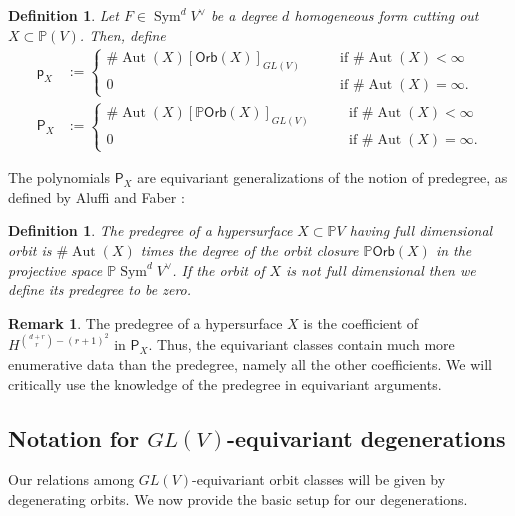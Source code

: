 \documentclass[12 pt, reqno]{amsart}
\newtheorem{defn}[thm]{Definition}
\theoremstyle{definition}
\newtheorem{rmk}[thm]{Remark}
\newcommand{\on}{\operatorname}
\newcommand{\mb}{\mathbb}
\renewcommand{\P}{\mb{P}}
\newcommand{\Orb}{\mathsf{Orb}}
\newcommand{\p}{\mathsf{p}}
\begin{document}
\begin{defn}
\label{orbitthomdef}
Let $F \in \on{Sym}^dV^{\vee}$ be a degree $d$ homogeneous form
cutting out $X \subset \mathbb{P}(V)$. Then, define
\begin{align*}
  \p_X&:= \begin{cases}
    \#\on{Aut}(X)[\Orb(X)]_{GL(V)} &\qquad\text{if $\#\on{Aut}(X)<\infty$}\\
    0 &\qquad\text{if $\#\on{Aut}(X)=\infty$}.
  \end{cases}\\
  \mathsf{P}_X&:= \begin{cases}
    \#\on{Aut}(X)[\mb{P}\Orb(X)]_{GL(V)} &\qquad\text{if $\#\on{Aut}(X)<\infty$}\\
    0 &\qquad\text{if $\#\on{Aut}(X)=\infty$}.
    \end{cases}   
\end{align*}
\end{defn}

The polynomials $\mathsf{P}_X$ are equivariant generalizations of the
notion of predegree, as defined by Aluffi and Faber
\cite[Definition]{AF93}:
\begin{defn}
\label{predegree}
The {\sl predegree} of a hypersurface $X \subset \P V$ having full
dimensional orbit is $\#\on{Aut}(X)$ times the degree of the orbit
closure $\P \Orb(X)$ in the projective space
$\mb{P} \on{Sym}^{d}V^{\vee}$.  If the orbit of $X$ is not full
dimensional then we define its predegree to be zero.
\end{defn}
\begin{rmk}
  The predegree of a hypersurface $X$ is the coefficient of
  $H^{{d+r \choose r}-(r+1)^2}$ in $\mathsf{P}_{X}$.  Thus, the
  equivariant classes contain much more enumerative data than the
  predegree, namely all the other coefficients.  We will critically
  use the knowledge of the predegree in equivariant arguments.
\end{rmk}

\subsection{Notation for $GL(V)$-equivariant degenerations}
Our relations among $GL(V)$-equivariant orbit classes will be given by
degenerating orbits.  We now provide the basic setup for our
degenerations.
\end{document}
